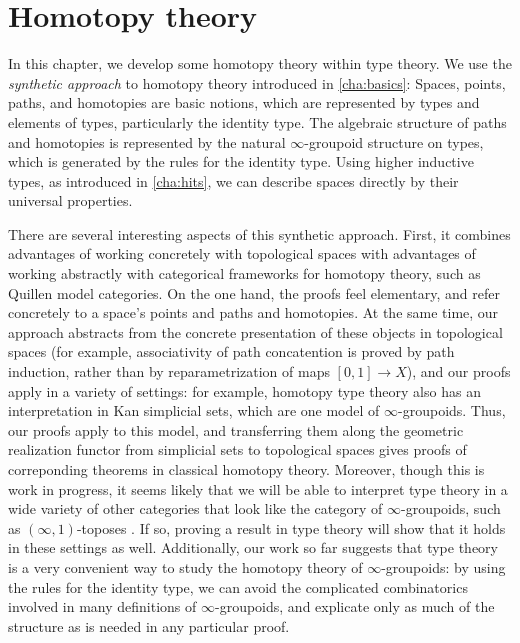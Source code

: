 \chapter{Homotopy theory}
\label{cha:homotopy}

In this chapter, we develop some homotopy theory within type theory.  We
use the \emph{synthetic approach} to homotopy theory introduced in
\cref{cha:basics}: Spaces, points, paths, and homotopies are basic
notions, which are represented by types and elements of types, particularly
the identity type.  The algebraic structure of paths and homotopies is
represented by the natural $\infty$-groupoid
%
structure on types, which is generated
by the rules for the identity type.  Using higher inductive types, as
introduced in \cref{cha:hits}, we can describe spaces directly by their
universal properties.  

There are several interesting aspects of this synthetic approach.
First, it combines advantages of working concretely with topological
spaces with advantages of working abstractly with categorical frameworks
for homotopy theory, such as Quillen model categories.  On the one hand,
the proofs feel elementary, and refer concretely to a space's
points and paths and homotopies.  At the same time, our approach abstracts from
the concrete presentation of these objects in topological spaces
%
(for example,
associativity of path concatention is proved by path induction, rather
than by reparametrization of maps $[0,1] \to X$), and our proofs apply
in a variety of settings: for example, homotopy type theory also has an interpretation in
Kan simplicial sets, which are one model of $\infty$-groupoids.  Thus,
our proofs apply to this model, and transferring them along the geometric
realization functor from simplicial sets to topological spaces gives
proofs of  correponding theorems in classical homotopy theory.
Moreover, though this is work in progress, it seems likely that we will
be able to interpret type theory in a wide variety of other categories
that look like the category of $\infty$-groupoids, such as
$(\infty,1)$-toposes
.%
If so, proving a result in type theory will show
that it holds in these settings as well.  Additionally, our work so far
suggests that type theory is a very convenient way to study the homotopy theory
of $\infty$-groupoids: by using the rules for the identity type, we
can avoid the complicated combinatorics involved in many definitions of
$\infty$-groupoids, and explicate only as much of the
structure as is needed in any particular proof.  

